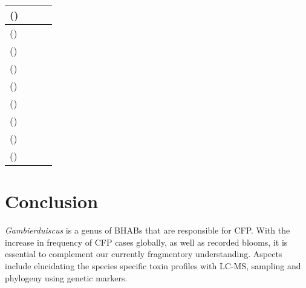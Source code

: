 \documentclass[12pt]{article}
\begin{document}
\begin{longtable}{  | p{3cm} | p{4.5cm} | p{2.95cm} | p{3.95cm} | }
\hline
   \emph{} () &  &  & \\
\hline
  \emph{} () &  &  & \\
\hline
   \emph{} () &  &  & \\
\hline
  \emph{} ()  &  &  & \\
\hline
  \emph{} ()  &  &  & \\
\hline
  \emph{} ()  &  &  & \\
\hline
  \emph{} () &  &  & \\
\hline
   \emph{} () &  &  & \\
\hline
  \emph{} ()  &  &  & \\
\hline
\end{longtable}

\FloatBarrier

\section{Conclusion}
\emph{Gambierduiscus} is a genus of BHABs that are responsible for CFP. With the increase in frequency of CFP cases globally, as well as recorded blooms, it is essential to complement our currently fragmentory understanding. Aspects include elucidating the species specific toxin profiles with LC-MS, sampling and phylogeny using genetic markers.

\newpage



\end{document}
